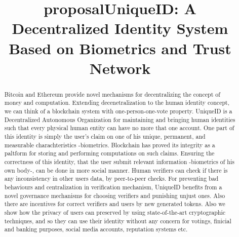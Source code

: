 \documentclass[conference]{IEEEtran}
\title{proposal}
\begin{document}
\title{UniqueID: A Decentralized Identity System Based on Biometrics and Trust Network}
\author{
	\and
	}
	\maketitle
	
\begin{abstract}
	Bitcoin and Ethereum  provide novel mechanisms for decentralizing the concept of money and computation. Extending decenetralization to the human identity concept, we can think of a blockchain system with one-person-one-vote property. UniqueID is a Decentralized Autonomous Organization for maintaining and bringing human identities such that every physical human entity can have no more that one account. One part of this identity is simply the user's claim on one of  his unique, permanent, and measurable charachteristics -biometrics. Blockchain has proved its integrity as a paltform for storing and performing computations on such claims. Ensuring the correctness of this identity, that the user submit relevant information -biometrics of his own body-, can be done in more social manner. Human verifiers can check if there is any inconsistency in other users data, by peer-to-peer checks. For preventing bad behaviours and centralization in verification mechanism, UniqueID benefits from a novel governance mechanisms for choosing verifiers and punishing unjust ones. Also there are incentives for correct verifiers and users by new generated tokens. Also we show how the privacy of users can preserved by using state-of-the-art cryptographic techniques, and so they can use their identity without any concern for votings, finicial and banking purposes, social media accounts, reputation systems etc.
	
	
\end{abstract}
\end{document}

